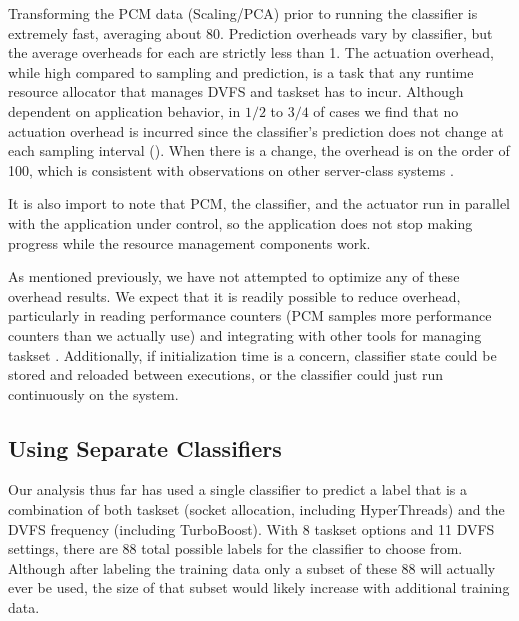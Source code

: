 Transforming the PCM data (Scaling/PCA) prior to running the classifier is extremely fast, averaging about 80\us.
Prediction overheads vary by classifier, but the average overheads for each are strictly less than 1\ms.
The actuation overhead, while high compared to sampling and prediction, is a task that any runtime resource allocator that manages DVFS and taskset has to incur.
Although dependent on application behavior, in $1/2$ to $3/4$ of cases we find that no actuation overhead is incurred since the classifier's prediction does not change at each sampling interval ().
When there is a change, the overhead is on the order of 100\ms, which is consistent with observations on other server-class systems \cite{POETMCSoC}.

It is also import to note that PCM, the classifier, and the actuator run in parallel with the application under control, so the application does not stop making progress while the resource management components work.

As mentioned previously, we have not attempted to optimize any of these overhead results.
We expect that it is readily possible to reduce overhead, particularly in reading performance counters (PCM samples more performance counters than we actually use) and integrating with other tools for managing taskset \cite{Sridharan2013}.
Additionally, if initialization time is a concern, classifier state could be stored and reloaded between executions, or the classifier could just run continuously on the system.


\subsection{Using Separate Classifiers}
\label{sec:eval-separate-classifiers}

Our analysis thus far has used a single classifier to predict a label that is a combination of both taskset (socket allocation, including HyperThreads) and the DVFS frequency (including TurboBoost).
With 8 taskset options and 11 DVFS settings, there are 88 total possible labels for the classifier to choose from.
Although after labeling the training data only a subset of these 88 will actually ever be used, the size of that subset would likely increase with additional training data.

